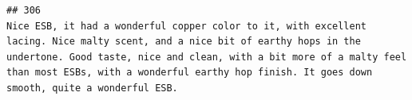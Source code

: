 \documentclass[
  a4paper,
]{article}
\begin{document}
\begin{verbatim}
## 306                                                                                                                                                                                                                                                                                                                                                                                                                                                                                                                                                                                                                                                                                                                                                                                                                                                                                                                                                                                                                                                                                                                                                                                                                                                                                                                                                                                                                                                                                 Nice ESB, it had a wonderful copper color to it, with excellent lacing. Nice malty scent, and a nice bit of earthy hops in the undertone. Good taste, nice and clean, with a bit more of a malty feel than most ESBs, with a wonderful earthy hop finish. It goes down smooth, quite a wonderful ESB.

\end{verbatim}
\end{document}
